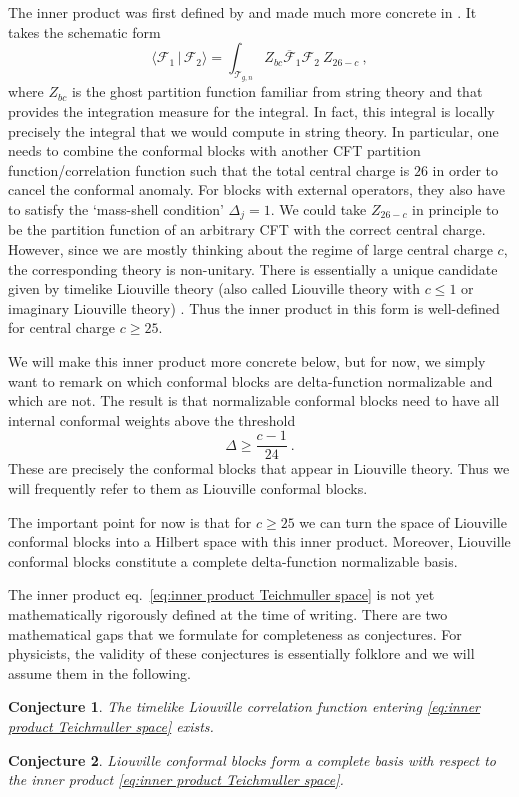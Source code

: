 \documentclass[12pt,a4paper]{article}
\newcommand{\be}{\begin{equation}}
\newcommand{\ee}{\end{equation}}
\newtheorem{conj}{Conjecture}
\begin{document}
The inner product was first defined by \cite{Verlinde:1989ua} and made much more concrete in \cite{Collier:2023fwi}. It takes the schematic form
\be 
\langle \mathcal{F}_1 \, | \, \mathcal{F}_2 \rangle=\int_{\mathcal{T}_{g,n}} Z_{bc} \overline{\mathcal{F}}_1 \mathcal{F}_2\ Z_{26-c}\ , \label{eq:inner product Teichmuller space}
\ee
where $Z_{bc}$ is the ghost partition function familiar from string theory and that provides the integration measure for the integral. In fact, this integral is locally precisely the integral that we would compute in string theory. In particular, one needs to combine the conformal blocks with another CFT partition function/correlation function such that the total central charge is $26$ in order to cancel the conformal anomaly. For blocks with external operators, they also have to satisfy the `mass-shell condition' $\Delta_j=1$. We could take $Z_{26-c}$ in principle to be the partition function of an arbitrary CFT with the correct central charge. However, since we are mostly thinking about the regime of large central charge $c$, the corresponding theory is non-unitary. There is essentially a unique candidate given by timelike Liouville theory (also called Liouville theory with $c \le 1$ or imaginary Liouville theory) \cite{Schomerus:2003vv, Zamolodchikov:2005fy, Kostov:2005kk, Ribault:2015sxa}. Thus the inner product in this form is well-defined for central charge $c \ge 25$.

We will make this inner product more concrete below, but for now, we simply want to remark on which conformal blocks are delta-function normalizable and which are not. The result is that normalizable conformal blocks need to have all internal conformal weights above the threshold
\be 
\Delta \ge \frac{c-1}{24}\ .
\ee
These are precisely the conformal blocks that appear in Liouville theory. Thus we will frequently refer to them as Liouville conformal blocks.

The important point for now is that for $c \ge 25$ we can turn the space of Liouville conformal blocks into a Hilbert space with this inner product. Moreover, Liouville conformal blocks constitute a complete delta-function normalizable basis.

The inner product eq.~\eqref{eq:inner product Teichmuller space} is not yet mathematically rigorously defined at the time of writing. There are two mathematical gaps that we formulate for completeness as conjectures.
For physicists, the validity of these conjectures is essentially folklore and we will assume them in the following.
\begin{conj} \label{conj:timelike Liouville exists}
The timelike Liouville correlation function entering \eqref{eq:inner product Teichmuller space} exists.
\end{conj}
\begin{conj} \label{conj:complete basis}
Liouville conformal blocks form a complete basis with respect to the inner product \eqref{eq:inner product Teichmuller space}.
\end{conj}
\end{document}
